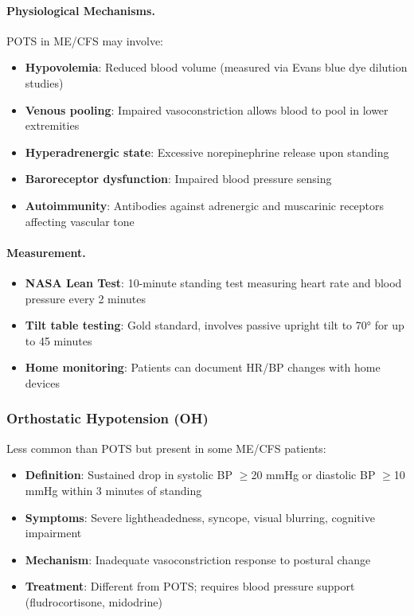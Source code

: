 \paragraph{Physiological Mechanisms.}
POTS in ME/CFS may involve:
\begin{itemize}
    \item \textbf{Hypovolemia}: Reduced blood volume (measured via Evans blue dye dilution studies)
    \item \textbf{Venous pooling}: Impaired vasoconstriction allows blood to pool in lower extremities
    \item \textbf{Hyperadrenergic state}: Excessive norepinephrine release upon standing
    \item \textbf{Baroreceptor dysfunction}: Impaired blood pressure sensing
    \item \textbf{Autoimmunity}: Antibodies against adrenergic and muscarinic receptors affecting vascular tone
\end{itemize}

\paragraph{Measurement.}
\begin{itemize}
    \item \textbf{NASA Lean Test}: 10-minute standing test measuring heart rate and blood pressure every 2 minutes
    \item \textbf{Tilt table testing}: Gold standard, involves passive upright tilt to 70° for up to 45 minutes
    \item \textbf{Home monitoring}: Patients can document HR/BP changes with home devices
\end{itemize}

\subsubsection{Orthostatic Hypotension (OH)}

Less common than POTS but present in some ME/CFS patients:
\begin{itemize}
    \item \textbf{Definition}: Sustained drop in systolic BP $\geq$20 mmHg or diastolic BP $\geq$10 mmHg within 3 minutes of standing
    \item \textbf{Symptoms}: Severe lightheadedness, syncope, visual blurring, cognitive impairment
    \item \textbf{Mechanism}: Inadequate vasoconstriction response to postural change
    \item \textbf{Treatment}: Different from POTS; requires blood pressure support (fludrocortisone, midodrine)
\end{itemize}

